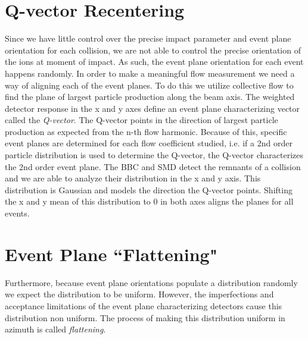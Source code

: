 \section{Q-vector Recentering}
Since we have little control over the precise impact parameter and event plane orientation for each collision, we are not able to control the precise orientation of the ions at moment of impact. As such, the event plane orientation for each event happens randomly. In order to make a meaningful flow measurement we need a way of aligning each of the event planes. To do this we utilize collective flow to find the plane of largest particle production along the beam axis. The weighted detector response in the x and y axes define an event plane characterizing vector called the \textit{Q-vector}. The Q-vector points in the direction of largest particle production as expected from the n-th flow harmonic. Because of this, specific event planes are determined for each flow coefficient studied, i.e. if a 2nd order particle distribution is used to determine the Q-vector, the Q-vector characterizes the 2nd order event plane. The BBC and SMD detect the remnants of a collision and we are able to analyze their distribution in the x and y axis. This distribution is Gaussian and models the direction the Q-vector points. Shifting the x and y mean of this distribution to 0 in both axes aligns the planes for all events.

\section{Event Plane ``Flattening"}
Furthermore, because event plane orientations populate a distribution randomly we expect the distribution to be uniform. However, the imperfections and acceptance limitations of the event plane characterizing detectors cause this distribution non uniform. The process of making this distribution uniform in azimuth is called \textit{flattening}.

